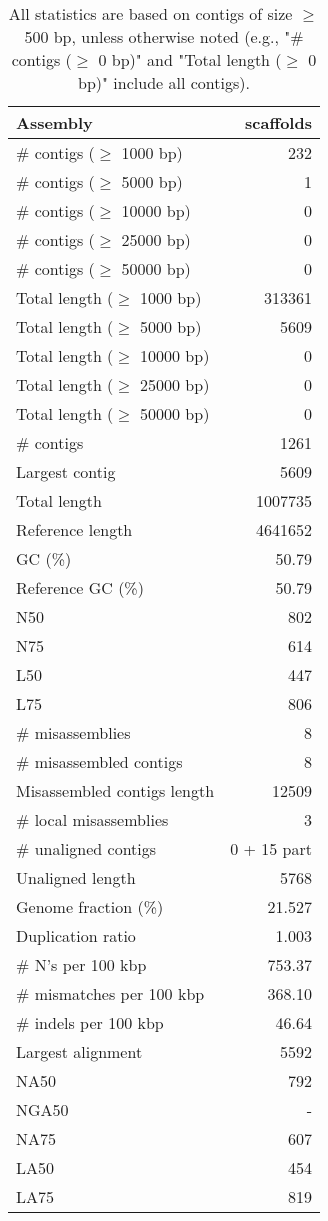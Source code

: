 \documentclass[12pt,a4paper]{article}
\begin{document}
\begin{table}[ht]
\begin{center}
\caption{All statistics are based on contigs of size $\geq$ 500 bp, unless otherwise noted (e.g., "\# contigs ($\geq$ 0 bp)" and "Total length ($\geq$ 0 bp)" include all contigs).}
\begin{tabular}{|l*{1}{|r}|}
\hline
Assembly & scaffolds \\ \hline
\# contigs ($\geq$ 1000 bp) & 232 \\ \hline
\# contigs ($\geq$ 5000 bp) & 1 \\ \hline
\# contigs ($\geq$ 10000 bp) & 0 \\ \hline
\# contigs ($\geq$ 25000 bp) & 0 \\ \hline
\# contigs ($\geq$ 50000 bp) & 0 \\ \hline
Total length ($\geq$ 1000 bp) & 313361 \\ \hline
Total length ($\geq$ 5000 bp) & 5609 \\ \hline
Total length ($\geq$ 10000 bp) & 0 \\ \hline
Total length ($\geq$ 25000 bp) & 0 \\ \hline
Total length ($\geq$ 50000 bp) & 0 \\ \hline
\# contigs & 1261 \\ \hline
Largest contig & 5609 \\ \hline
Total length & 1007735 \\ \hline
Reference length & 4641652 \\ \hline
GC (\%) & 50.79 \\ \hline
Reference GC (\%) & 50.79 \\ \hline
N50 & 802 \\ \hline
N75 & 614 \\ \hline
L50 & 447 \\ \hline
L75 & 806 \\ \hline
\# misassemblies & 8 \\ \hline
\# misassembled contigs & 8 \\ \hline
Misassembled contigs length & 12509 \\ \hline
\# local misassemblies & 3 \\ \hline
\# unaligned contigs & 0 + 15 part \\ \hline
Unaligned length & 5768 \\ \hline
Genome fraction (\%) & 21.527 \\ \hline
Duplication ratio & 1.003 \\ \hline
\# N's per 100 kbp & 753.37 \\ \hline
\# mismatches per 100 kbp & 368.10 \\ \hline
\# indels per 100 kbp & 46.64 \\ \hline
Largest alignment & 5592 \\ \hline
NA50 & 792 \\ \hline
NGA50 & - \\ \hline
NA75 & 607 \\ \hline
LA50 & 454 \\ \hline
LA75 & 819 \\ \hline
\end{tabular}
\end{center}
\end{table}
\end{document}
